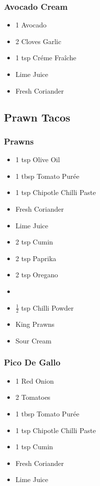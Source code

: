 \documentclass[11pt, english]{article}
\begin{document}
		\subsubsection*{Avocado Cream}

	\begin{itemize}
        \setlength\itemsep{0cm}
                \item 1 Avocado
		\item 2 Cloves Garlic
		\item 1 tsp Cr\'{e}me Fra\^{i}che
		\item Lime Juice
		\item Fresh Coriander
        \end{itemize}

\newpage

	\subsection{Prawn Tacos}

		\subsubsection*{Prawns}

	\begin{itemize}
        \setlength\itemsep{0cm}
                \item 1 tsp Olive Oil
		\item 1 tbsp Tomato Pur\'{e}e
		\item 1 tsp Chipotle Chilli Paste
		\item Fresh Coriander
		\item Lime Juice
		\item 2 tsp Cumin
		\item 2 tsp Paprika
		\item 2 tsp Oregano
		\item \item $\frac{1}{2}$ tsp Chilli Powder
		\item King Prawns
		\item Sour Cream
        \end{itemize}
	
		\subsubsection*{Pico De Gallo}
	
	\begin{itemize}
        \setlength\itemsep{0cm}
                \item 1 Red Onion
		\item 2 Tomatoes
		\item 1 tbsp Tomato Pur\'{e}e
		\item 1 tsp Chipotle Chilli Paste
		\item 1 tsp Cumin
		\item Fresh Coriander
		\item Lime Juice
        \end{itemize}
\end{document}

